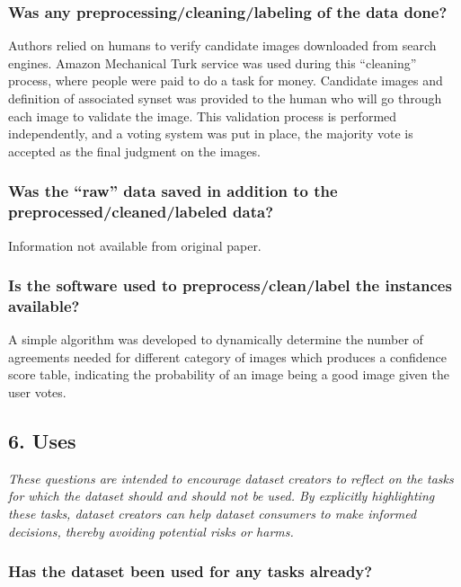 \documentclass[a4paper,12pt]{article}
\begin{document}
\subsubsection*{Was any preprocessing/cleaning/labeling of the data done?}

Authors relied on humans to verify candidate images downloaded from search engines. Amazon
Mechanical Turk service was used during this ``cleaning'' process, where people were paid to do a
task for money. Candidate images and definition of associated synset was provided to the human
who will go through each image to validate the image. This validation process is performed
independently, and a voting system was put in place, the majority vote is accepted as the final
judgment on the images.

\subsubsection*{Was the ``raw'' data saved in addition to the preprocessed/cleaned/labeled data?}

Information not available from original paper.

\subsubsection*{Is the software used to preprocess/clean/label the instances available?}

A simple algorithm was developed to dynamically determine the number of agreements needed for
different category of images which produces a confidence score table, indicating the probability of
an image being a good image given the user votes.

\subsection*{6. Uses}

\textsl{These questions are intended to encourage dataset creators to reflect
on the tasks for which the dataset should and should not be used. By explicitly
highlighting these tasks, dataset creators can help dataset consumers to make
informed decisions, thereby avoiding potential risks or harms.}

\subsubsection*{Has the dataset been used for any tasks already?}
\end{document}
